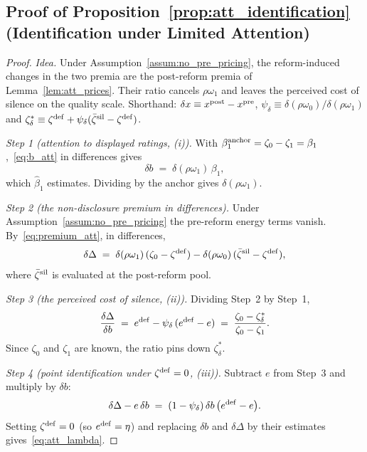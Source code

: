 \subsection*{Proof of Proposition~\ref{prop:att_identification} (Identification under Limited Attention)}

\begin{proof}\upshape
\emph{Idea.} Under Assumption~\ref{assum:no_pre_pricing}, the reform-induced changes in the two premia are the post-reform premia of Lemma~\ref{lem:att_prices}. Their ratio cancels $\rho\omega_1$ and leaves the perceived cost of silence on the quality scale. Shorthand: $\delta x\equiv x^{\rm post}-x^{\rm pre}$, $\psi_\delta\equiv\delta(\rho\omega_0)/\delta(\rho\omega_1)$ and $\zeta^*_\delta\equiv \zeta^{\rm def}+\psi_\delta(\bar \zeta^{\rm sil}-\zeta^{\rm def})$.

\emph{Step 1 (attention to displayed ratings, (i)).} With $\beta_1^{\rm anchor}=\zeta_0-\zeta_1=\beta_1$,~\eqref{eq:b_att} in differences gives
\begin{equation*}
    \delta b\;=\;\delta(\rho\omega_1)\,\beta_1,
\end{equation*}
which $\hat\beta_1$ estimates. Dividing by the anchor gives $\delta(\rho\omega_1)$.

\emph{Step 2 (the non-disclosure premium in differences).} Under Assumption~\ref{assum:no_pre_pricing} the pre-reform energy terms vanish. By~\eqref{eq:premium_att}, in differences,
\begin{equation*}
    \delta\Delta\;=\;\delta(\rho\omega_1)\,(\zeta_0-\zeta^{\rm def})-\delta(\rho\omega_0)\,(\bar \zeta^{\rm sil}-\zeta^{\rm def}),
\end{equation*}
where $\bar \zeta^{\rm sil}$ is evaluated at the post-reform pool.

\emph{Step 3 (the perceived cost of silence, (ii)).} Dividing Step~2 by Step~1,
\begin{equation*}
    \frac{\delta\Delta}{\delta b}\;=\;e^{\rm def}-\psi_\delta\,(e^{\rm def}-e)\;=\;\frac{\zeta_0-\zeta^*_\delta}{\zeta_0-\zeta_1}.
\end{equation*}
Since $\zeta_0$ and $\zeta_1$ are known, the ratio pins down $\zeta^*_\delta$.

\emph{Step 4 (point identification under $\zeta^{\rm def}=0$, (iii)).} Subtract $e$ from Step~3 and multiply by $\delta b$:
\begin{equation*}
    \delta\Delta-e\,\delta b\;=\;(1-\psi_\delta)\,\delta b\,\big(e^{\rm def}-e\big).
\end{equation*}
Setting $\zeta^{\rm def}=0$ (so $e^{\rm def}=\eta$) and replacing $\delta b$ and $\delta\Delta$ by their estimates gives~\eqref{eq:att_lambda}.


\end{proof}
